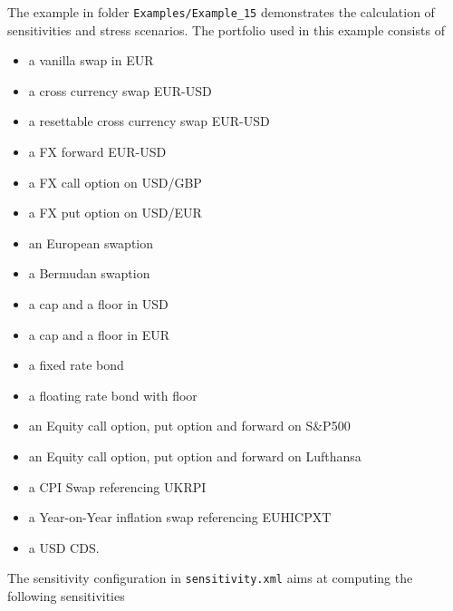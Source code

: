 The example in folder {\tt Examples/Example\_15} demonstrates the calculation of sensitivities and stress scenarios. The
portfolio used in this example consists of

\begin{itemize}
\item a vanilla swap in EUR
\item a cross currency swap EUR-USD
\item a resettable cross currency swap EUR-USD
\item a FX forward EUR-USD
\item a FX call option on USD/GBP %
\item a FX put option on USD/EUR
\item an European swaption
\item a Bermudan swaption
\item a cap and a floor in USD
\item a cap and a floor in EUR
\item a fixed rate bond
\item a floating rate bond with floor
\item an Equity call option, put option and forward on S\&P500
\item an Equity call option, put option and forward on Lufthansa
\item a CPI Swap referencing UKRPI
\item a Year-on-Year inflation swap referencing EUHICPXT
\item a USD CDS.
\end{itemize}

The sensitivity configuration in {\tt sensitivity.xml} aims at computing the following sensitivities

